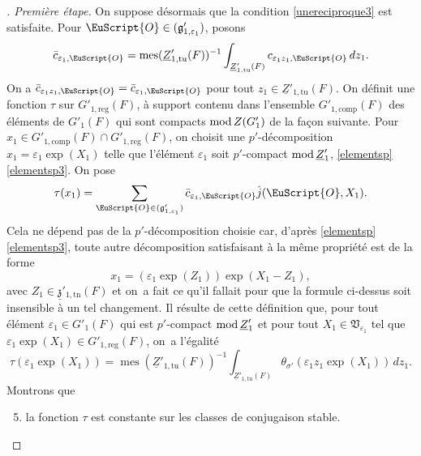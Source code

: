 \documentclass[JEP,XML,SOM,Unicode,francais]{cedram}
\let\mathcal \EuScript
\newcommand{\NoChangel}[1]{%
\expandafter\let\csname old\string#1\endcsname=#1
\let#1=\relax
\newcommand{#1}{\mathcode`l="716C\csname old\string#1\endcsname\mathcode`l="7160 }%
}
\let\epsilon\varepsilon
\newcommand{\rmod}{\textup{mod}\,}
\newcommand{\frg}{\mathfrak{g}}
\newcommand{\frz}{\mathfrak{z}}
\newcommand{\frV}{\mathfrak{V}}
\newcommand{\comp}{\mathrm{comp}}
\newcommand{\Nil}{\mathrm{Nil}} \NoChangel{\Nil}
\newcommand{\reg}{\mathrm{reg}}
\newcommand{\tn}{\mathrm{tn}}
\newcommand{\tu}{\mathrm{tu}}
\DeclareMathOperator{\mes}{mes}
\newcommand{\cO}{\mathcal{O}}
\theoremstyle{plain}
\theoremstyle{definition}
\begin{document}
\begin{proof}[\proofname. Première étape]
On suppose désormais que la condition \eqref{unereciproque3} est satisfaite. Pour $\cO\in \Nil(\frg'_{1,\epsilon_{1}})$, posons
\[
\bar{c}_{\epsilon_{1},\cO}=\mes(\underline{Z}'_{1,\tu}(F))^{-1}\int_{\underline{Z}'_{1,\tu}(F)}c_{\epsilon_{1}z_{1},\cO}\,dz_{1}.
\]
On a $\bar{c}_{\epsilon_{1}z_{1},\cO}=\bar{c}_{\epsilon_{1},\cO}$ pour tout $z_{1}\in \underline{Z}'_{1,\tu}(F)$. On définit une fonction $\tau$ sur $G'_{1,\reg}(F)$, à support contenu dans l'ensemble $G'_{1,\comp}(F)$ des éléments de $G'_{1}(F)$ qui sont compacts $\rmod Z(G'_{1})$ de la façon suivante. Pour $x_{1}\in G'_{1,\comp}(F)\cap G'_{1,\reg}(F)$, on choisit une $p'$-décomposition $x_{1}=\epsilon_{1}\exp(X_{1})$ telle que l'élément $\epsilon_{1}$ soit $p'$-compact $\rmod \underline{Z}'_{1}$, \cf \ref{elementsp}\,\eqref{elementsp3}. On pose
\[
\tau(x_{1})=\sum_{\cO\in \Nil(\frg'_{1,\epsilon_{1}})}\bar{c}_{\epsilon_{1},\cO}\hat{j}(\cO,X_{1}).
\]
Cela ne dépend pas de la $p'$-décomposition choisie car, d'après \ref{elementsp}\,\eqref{elementsp3}, toute autre décomposition satisfaisant à la même propriété est de la forme
\[
x_{1}=(\epsilon_{1}\exp(Z_{1}))\exp(X_{1}-Z_{1}),
\]
avec $Z_{1}\in \underline{\frz}'_{1,\tn}(F)$ et on~a fait ce qu'il fallait pour que la formule ci-dessus soit insensible à un tel changement. Il résulte de cette définition que, pour tout élément $\epsilon_{1}\in G'_{1}(F)$ qui est $p'$-compact $\rmod \underline{Z}'_{1}$ et pour tout $X_{1}\in \frV_{\epsilon_{1}}$ tel que $\epsilon_{1}\exp(X_{1})\in G'_{1,\reg}(F)$, on~a l'égalité
\begin{equation}\tag{4}\label{unereciproque4}
\tau(\epsilon_{1}\exp(X_{1}))=\mes(\underline{Z}'_{1,\tu}(F))^{-1}\int_{\underline{Z}'_{1,\tu}(F)}\theta_{\sigma'}(\epsilon_{1}z_{1}\exp(X_{1}))\,dz_{1}.
\end{equation}
Montrons que
\begin{enumerate}\setcounter{enumi}{4}
\item\label{unereciproque5}
la fonction $\tau$ est constante sur les classes de conjugaison stable.
\end{enumerate}


\end{proof}
\end{document}

